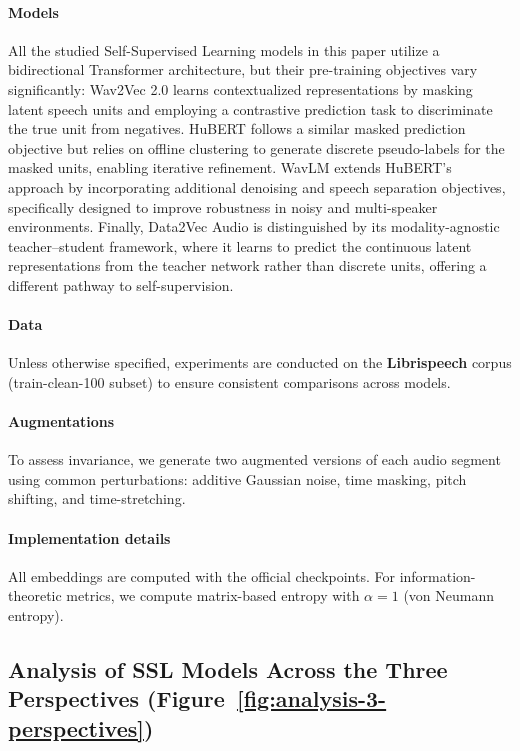 \documentclass[5p]{elsarticle}
\begin{document}
\paragraph{Models} All the studied  Self-Supervised Learning models in this paper utilize a bidirectional Transformer architecture, but their pre-training objectives vary significantly: Wav2Vec 2.0 learns contextualized representations by masking latent speech units and employing a contrastive prediction task to discriminate the true unit from negatives. HuBERT follows a similar masked prediction objective but relies on offline clustering to generate discrete pseudo-labels for the masked units, enabling iterative refinement. WavLM extends HuBERT's approach by incorporating additional denoising and speech separation objectives, specifically designed to improve robustness in noisy and multi-speaker environments. Finally, Data2Vec Audio is distinguished by its modality-agnostic teacher–student framework, where it learns to predict the continuous latent representations from the teacher network rather than discrete units, offering a different pathway to self-supervision. 

\paragraph{Data} Unless otherwise specified, experiments are conducted on the \textbf{Librispeech} corpus (train-clean-100 subset) to ensure consistent comparisons across models.  

\paragraph{Augmentations} To assess invariance, we generate two augmented versions of each audio segment using common perturbations: additive Gaussian noise, time masking, pitch shifting, and time-stretching.  

\paragraph{Implementation details} All embeddings are computed with the official checkpoints. For information-theoretic metrics, we compute matrix-based entropy with $\alpha=1$ (von Neumann entropy).


\subsection{Analysis of SSL Models Across the Three Perspectives (Figure~\ref{fig:analysis-3-perspectives})}
\end{document}
